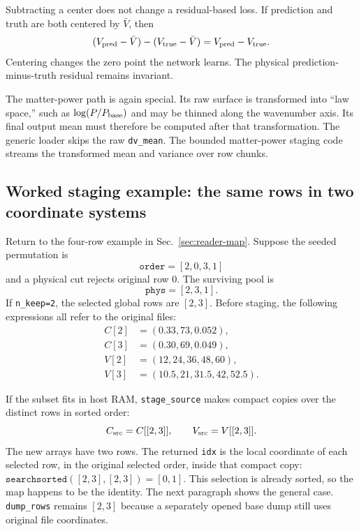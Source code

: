 \documentclass[10pt,aps,prd,twocolumn,nofootinbib]{revtex4-2}
\newcommand{\code}[1]{\texttt{#1}}
\begin{document}
Subtracting a center does not change a residual-based loss.  If prediction
and truth are both centered by $\bar V$, then
\begin{equation}
  (V_{\rm pred}-\bar V)-(V_{\rm true}-\bar V)
  = V_{\rm pred}-V_{\rm true}.
\end{equation}
Centering changes the zero point the network learns.  The physical
prediction-minus-truth residual remains invariant.

The matter-power path is again special.  Its raw surface is transformed into
``law space,'' such as $\log(P/P_{\rm base})$ and may be thinned along
the wavenumber axis.  Its final output mean must therefore be computed after
that transformation.  The generic loader skips the raw \code{dv\_mean}.  The
bounded matter-power staging code streams the transformed mean and variance
over row chunks.

\subsection{Worked staging example: the same rows in two coordinate systems}

Return to the four-row example in Sec.~\ref{sec:reader-map}.  Suppose the
seeded permutation is
\begin{equation*}
  \code{order}=[2,0,3,1]
\end{equation*}
and a physical cut rejects original row 0.  The surviving pool is
\begin{equation*}
  \code{phys}=[2,3,1].
\end{equation*}
If \code{n\_keep=2}, the selected global rows are $[2,3]$.  Before staging,
the following expressions all refer to the original files:
\begin{align*}
  C[2]&=(0.33,73,0.052),\\
  C[3]&=(0.30,69,0.049),\\
  V[2]&=(12,24,36,48,60),\\
  V[3]&=(10.5,21,31.5,42,52.5).
\end{align*}

If the subset fits in host RAM, \code{stage\_source} makes compact copies over
the distinct rows in sorted order:
\begin{equation*}
 C_{\rm src}=C[[2,3]],\qquad V_{\rm src}=V[[2,3]].
\end{equation*}
The new arrays have two rows.  The returned \code{idx} is the local coordinate
of each selected row, in the original selected order, inside that compact
copy: $\code{searchsorted}([2,3],[2,3])=[0,1]$.  This selection is already
sorted, so the map happens to be the identity.  The next paragraph shows the
general case.  \code{dump\_rows} remains $[2,3]$ because a separately opened
base dump still uses original file coordinates.
\end{document}
